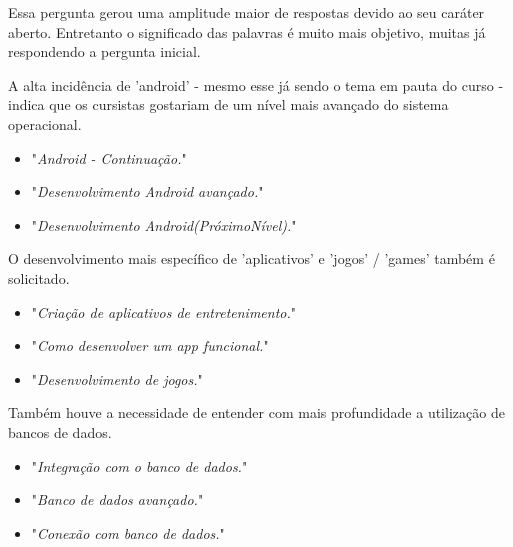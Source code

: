 Essa pergunta gerou uma amplitude maior de respostas devido ao seu caráter aberto. Entretanto o significado das palavras é muito mais objetivo, muitas já respondendo a pergunta inicial.

A alta incidência de 'android' - mesmo esse já sendo o tema em pauta do curso - indica que os cursistas gostariam de um nível mais avançado do sistema operacional.

\begin{itemize}
\item "\textit{Android - Continuação.}"
\item "\textit{Desenvolvimento Android avançado.}"
\item "\textit{Desenvolvimento Android(PróximoNível).}"
\end{itemize}

O desenvolvimento mais específico de 'aplicativos' e 'jogos' / 'games' também é solicitado.

\begin{itemize}
\item "\textit{Criação de aplicativos de entretenimento.}"
\item "\textit{Como desenvolver um app funcional.}"
\item "\textit{Desenvolvimento de jogos.}"
\end{itemize}

Também houve a necessidade de entender com mais profundidade a utilização de bancos de dados.

\begin{itemize}
\item "\textit{Integração com o banco de dados.}"
\item "\textit{Banco de dados avançado.}"
\item "\textit{Conexão com banco de dados.}"
\end{itemize}

